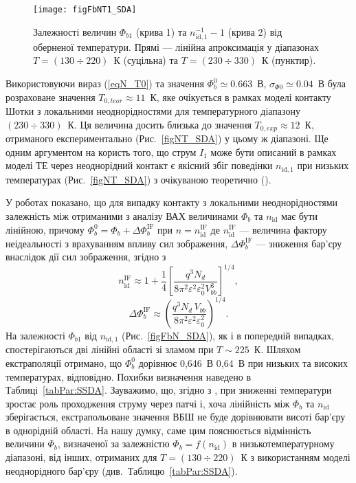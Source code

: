 \begin{figure}
\center
\texttt{[image: figFbNT1\_SDA]}
\caption{\label{figFbNT1_SDA}
Залежності величин $\Phi_{b1}$ (крива 1) та $n_{\mathrm{id},1}^{-1}-1$ (крива 2) від оберненої температури.
Прямі --- лінійна апроксимація у діапазонах $T=(130\div220)$~К (суцільна) та $T=(230\div330)$~К (пунктир).
}%
\end{figure}

Використовуючи вираз (\ref{eqN_T0}) та значення $\Phi_{b}^0\simeq0.663$~В, $\sigma_{\Phi0}\simeq0.04$~В
була розраховане значення $T_{0,teor}\approx11$~К, яке очікується в рамках моделі контакту Шотки з локальними неоднорідностями
для температурного діапазону $(230\div330)$~К.
Ця величина досить близька до значення $T_{0,exp}\approx12$~К, отриманого експериментально (Рис.~\ref{figNT_SDA}) у цьому ж діапазоні.
Ще одним аргументом на користь того, що струм $I_1$ може бути описаний в рамках моделі ТЕ через неоднорідний контакт є якісний збіг
поведінки $n_{\mathrm{id},1}$ при низьких температурах (Рис.~\ref{figNT_SDA}) з очікуваною теоретично (\cite[Fig.11(b)]{Tung:PhysRev}).


У роботах  \cite{Tung:PhysRev,Sarpatwari,Schmitsdorf} показано, що для випадку
контакту з локальними неоднорідностями залежність між отриманими з аналізу ВАХ величинами $\Phi_b$ та $n_\mathrm{id}$ має бути лінійною,
причому $\Phi_{b}^0=\Phi_{b}+\Delta\Phi_b^\mathrm{IF}$ при $n=n_\mathrm{id}^\mathrm{IF}$
де $n_\mathrm{id}^\mathrm{IF}$ ---  величина фактору неідеальності з врахуванням впливу сил зображення,
$\Delta\Phi_b^\mathrm{IF}$ --- зниження бар'єру внаслідок дії сил зображення,
згідно з \cite{Sarpatwari}
\begin{equation}\label{eqN:IF}
n_\mathrm{id}^\mathrm{IF}\approx 1+\frac14\left[\frac{q^3N_d}{8\pi^2\varepsilon^2\varepsilon_0^2V^3_{bb}}\right]^{1/4},
\end{equation}
\begin{equation}\label{eqFb:IF}
\Delta\Phi_b^\mathrm{IF}\approx \left(\frac{q^3N_d\,V_{bb}}{8\pi^2\varepsilon^2\varepsilon_0^2}\right)^{1/4}.
\end{equation}
На залежності $\Phi_{b1}$ від $n_{\mathrm{id},1}$ (Рис.~\ref{figFbN_SDA}), як і в попередній випадках,
спостерігаються дві лінійні області зі зламом при $T\sim225$~К.
Шляхом екстраполяції отримано, що $\Phi_b^0$ дорівнює 0,646~В 0,64~В при низьких та високих температурах, відповідно.
Похибки визначення наведено в Таблиці~\ref{tabPar:SSDA}.
Зауважимо, що, згідно з \cite{Sarpatwari,Schmitsdorf},
при зниженні температури зростає роль проходження струму через патчі і, хоча лінійність між  $\Phi_b$ та $n_\mathrm{id}$ зберігається,
екстрапольоване значення ВБШ не буде дорівнювати висоті бар'єру в однорідній області.
На нашу думку, саме цим пояснюється відмінність величини $\Phi_b$, визначеної за залежністю
$\Phi_b=f(n_\mathrm{id})$ в низькотемпературному діапазоні, від інших,
отриманих для $T=(130\div220)$~К з використанням моделі неоднорідного бар'єру (див.~Таблицю~\ref{tabPar:SSDA}).

